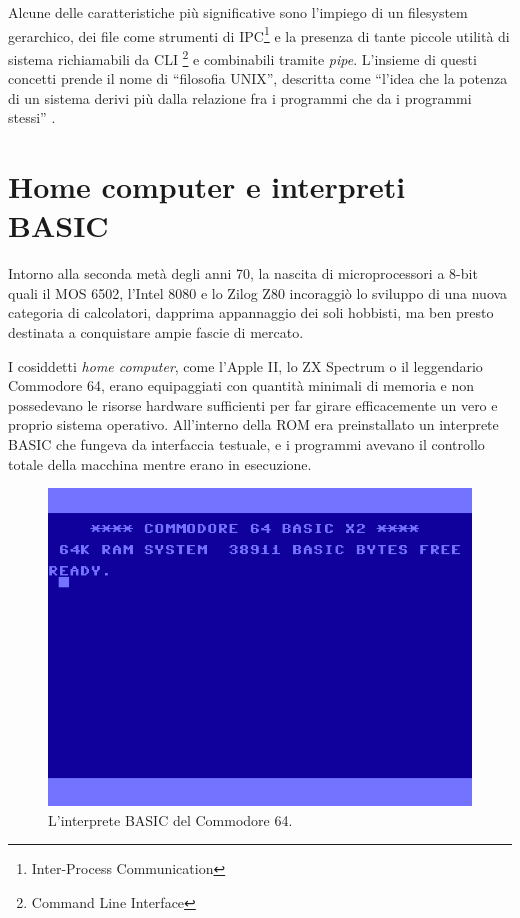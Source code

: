 \documentclass[12pt,a4paper]{report}
\newcommand{\vir}[1]{``#1''}
\begin{document}
		Alcune delle caratteristiche più significative sono l'impiego di un filesystem gerarchico, dei file come strumenti di
		IPC\footnote{Inter-Process Communication} e la presenza di tante piccole utilità di sistema richiamabili da CLI
		\footnote{Command Line Interface} e combinabili tramite \emph{pipe}.
		L'insieme di questi concetti prende il nome di \vir{filosofia UNIX}, descritta come \vir{l'idea che la potenza di un sistema
		derivi più dalla relazione fra i programmi che da i programmi stessi} \cite{Kernighan}.
		
	\section{Home computer e interpreti BASIC}
		Intorno alla seconda metà degli anni 70, la nascita di microprocessori a 8-bit quali il MOS 6502, l'Intel 8080 e lo Zilog Z80
		incoraggiò lo sviluppo di una nuova categoria di calcolatori, dapprima appannaggio dei soli hobbisti, ma ben presto
		destinata a conquistare ampie fascie di mercato.
		
		I cosiddetti \emph{home computer}, come l'Apple II, lo ZX Spectrum o il leggendario Commodore 64, erano equipaggiati
		con quantità minimali di memoria e non possedevano le risorse hardware sufficienti per far girare efficacemente un vero
		e proprio sistema operativo. All'interno della ROM era preinstallato un interprete BASIC che fungeva da interfaccia testuale,
		e i programmi avevano il controllo totale della macchina mentre erano in esecuzione.
		
		\begin{figure}[htbp]
		\centering
		\includegraphics[scale=0.5]{img/commodore64.png}
		\caption{L'interprete BASIC del Commodore 64.\label{fig:commodore64}}
		\end{figure}
		
\end{document}
